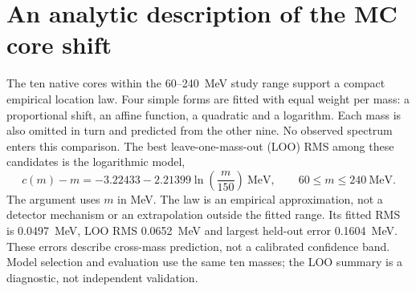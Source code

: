 \clearpage
\section{An analytic description of the MC core shift}
The ten native cores within the 60--240~MeV study range support a compact empirical
location law. Four simple forms are fitted with equal weight per mass:
a proportional shift, an affine function, a quadratic and a logarithm.
Each mass is also omitted in turn and predicted from the other nine.
No observed spectrum enters this comparison. The best leave-one-mass-out
(LOO) RMS among these candidates is the logarithmic model,
\begin{equation}
 c(m)-m=-3.22433-2.21399\ln\!\left(\frac{m}{150}\right)\ \mathrm{MeV},
 \qquad 60\leq m\leq240~\mathrm{MeV}.
\end{equation}
The argument uses $m$ in MeV. The law is an empirical approximation,
not a detector mechanism or an extrapolation outside the fitted range.
Its fitted RMS is 0.0497~MeV, LOO RMS 0.0652~MeV and largest held-out
error 0.1604~MeV. These errors describe cross-mass prediction, not a
calibrated confidence band. Model selection and evaluation use the same
ten masses; the LOO summary is a diagnostic, not independent validation.
\begin{table}[H]\centering\small

\caption{Analytic model comparison. Affine and quadratic forms use
$x=(m-150)/100$; coefficients and all held-out predictions are saved.}
\end{table}

\clearpage
